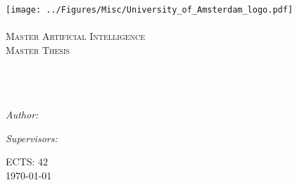 \documentclass[11pt, twoside]{Thesis} %
\begin{document}

\begin{titlepage}

\begin{center}
\texttt{[image: ../Figures/Misc/University\_of\_Amsterdam\_logo.pdf]}\\[0.2cm]
\textsc{\Large \univname}\\[0.7cm] %
\textsc{\LARGE Master Artificial Intelligence}\\[2.0cm]
\vspace{0.1cm}%
\textsc{\large Master Thesis}\\[0.5cm]
\HRule \\[0.4cm] %
{\huge \bfseries \ttitle}\\[0.4cm] %
\HRule \\[2.5cm] %
\begin{minipage}[t][5cm][t]{0,4\textwidth}
\begin{flushleft} \large
\emph{Author:}\\
\authornames
\end{flushleft}
\end{minipage}
\begin{minipage}[t][5cm][t]{0,4\textwidth}
\begin{flushright} \large
\emph{Supervisors:} \\
\supname
\end{flushright}
\end{minipage}
\begin{flushbottom}
\begin{center}
ECTS: $42$\\[4cm]
\large \today
\end{center}
\end{flushbottom}
\end{center}
\end{titlepage}

\cleardoublepage



\end{document}
